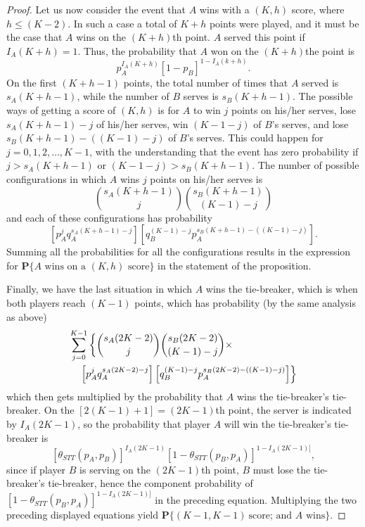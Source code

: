 \documentclass[11pt]{article}
\theoremstyle{plain}
\theoremstyle{definition}
\renewcommand{\Pr}{\mathbf{P}}
\begin{document}
\begin{proof}
{    Let us now consider the event that $A$ wins with a $(K,h)$ score, where $h \le (K-2)$. In such a case a total of $K+h$ points were played, and it must be the case that $A$ wins on the $(K+h)$th point. $A$ served this point if $I_A(K+h) = 1$. Thus, the probability that $A$ won on the $(K+h)$the point is 
    $$p_A^{I_A(K+h)} [1 - p_B]^{1 - I_A(k+h)}.$$
    On the first $(K+h-1)$ points, the total number of times that $A$ served is $s_A(K+h-1)$, while the number of $B$ serves is $s_B(K+h-1)$. The possible ways of getting a score of $(K,h)$ is for $A$ to win $j$ points on his/her serves, lose $s_A(K+h-1) - j$ of his/her serves, win $(K-1-j)$ of $B$'s serves, and lose $s_B(K+h-1) - ((K-1)-j)$ of $B$'s serves. This could happen for $j=0,1,2,\ldots,K-1$, with the understanding that the event has zero probability if $j > s_A(K+h-1)$ or $(K-1-j) > s_B(K+h-1)$. The number of possible configurations in which $A$ wins $j$ points on his/her serves is
    $${s_A(K+h-1) \choose j} {s_B(K+h-1) \choose {(K-1) - j}}$$
    and each of these configurations has probability
    $$\left[p_A^j q_A^{s_A(K+h-1) - j}\right]
        \left[q_B^{(K-1)-j} p_A^{s_B(K+h-1) - ((K-1)-j)}\right].$$
Summing all the probabilities for all the configurations results in the expression for $\Pr\{\mbox{$A$ wins on a $(K,h)$ score}\}$ in the statement of the proposition.

Finally, we have the last situation in which $A$ wins the tie-breaker, which is when both players reach $(K-1)$ points, which has probability (by the same analysis as above)
%
\begin{eqnarray*}
   \lefteqn{ \sum_{j=0}^{K-1} \left\{ {s_A(2K-2) \choose j} {s_B(2K-2) \choose {(K-1) - j}} \times \right. } \\ && \left.
        \left[p_A^j q_A^{s_A(2K-2) - j}\right]
        \left[q_B^{(K-1)-j} p_A^{s_B(2K-2) - ((K-1)-j)}\right]
        \right\}
\end{eqnarray*}
%
which then gets multiplied by the probability that $A$ wins the tie-breaker's tie-breaker. On the $[2(K-1)+1] = (2K -1)$th point, the server is indicated by $I_A(2K-1)$, so the probability that player $A$ will win the tie-breaker's tie-breaker is
%
$$[\theta_{STT}(p_A,p_B)]^{I_A(2K-1)} [1 - \theta_{STT}(p_B,p_A)]^{1 - I_A(2K-1)]},$$
%
since if player $B$ is serving on the $(2K-1)$th point, $B$ must lose the tie-breaker's tie-breaker, hence the component probability of $[1 - \theta_{STT}(p_B,p_A)]^{1 - I_A(2K-1)]}$ in the preceding equation.
%
Multiplying the two preceding displayed equations yield $\Pr\{(K-1,K-1)\ \mbox{score; and $A$ wins}\}$.

}
\end{proof}
\end{document}
